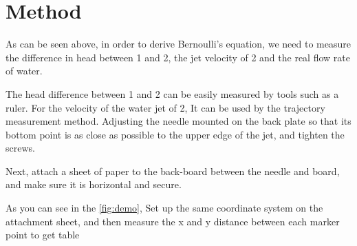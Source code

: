 \section{Method}

As can be seen above, in order to derive Bernoulli's equation, 
we need to measure the difference in head between 1 and 2, 
the jet velocity of 2 and the real flow rate of water.

The head difference between 1 and 2 can be easily measured by tools such as a ruler.
For the velocity of the water jet of 2, It can be used by the trajectory measurement method. 
Adjusting the needle mounted on the back plate so that its bottom point is as close as possible 
to the upper edge of the jet, and tighten the screws.

Next, attach a sheet 
of paper to the back-board between the needle and board,
and make sure it is horizontal and secure.

As you can see in the \autoref{fig:demo},
Set up the same coordinate system on the attachment sheet, 
and then measure the x and y distance between each marker point to get table 
